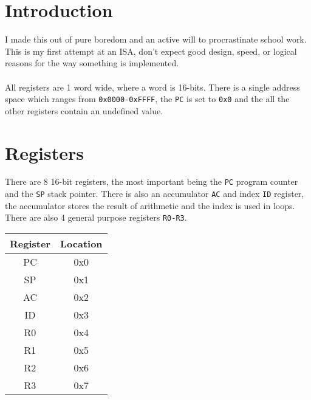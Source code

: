 \documentclass[a4paper,10pt]{article}
\begin{document}
\tableofcontents
\section{Introduction}
I made this out of pure boredom and an active will to procrastinate school work. This is my first attempt at an ISA, don't expect good design, speed, or logical reasons for the way something is implemented. \\\\
All registers are 1 word wide, where a word is 16-bits. There is a single address space which ranges from \texttt{0x0000-0xFFFF}, the \texttt{PC} is set to \texttt{0x0} and the all the other registers contain an undefined value.

\section{Registers}
There are 8 16-bit registers, the most important being the \texttt{PC} program counter and the \texttt{SP} stack pointer. There is also an accumulator \texttt{AC} and index \texttt{ID} register, the accumulator stores the result of arithmetic and the index is used in loops. There are also 4 general purpose registers \texttt{R0-R3}.

\begin{table}[h]
\begin{tabular}{|c|c|}
\hline
\multicolumn{1}{|l|}{\textbf{Register}} & \multicolumn{1}{l|}{\textbf{Location}} \\ \hline
PC & 0x0 \\
SP & 0x1 \\
AC & 0x2 \\
ID & 0x3 \\
R0 & 0x4 \\
R1 & 0x5 \\
R2 & 0x6 \\
R3 & 0x7 \\ \hline
\end{tabular}
\end{table}



\end{document}
